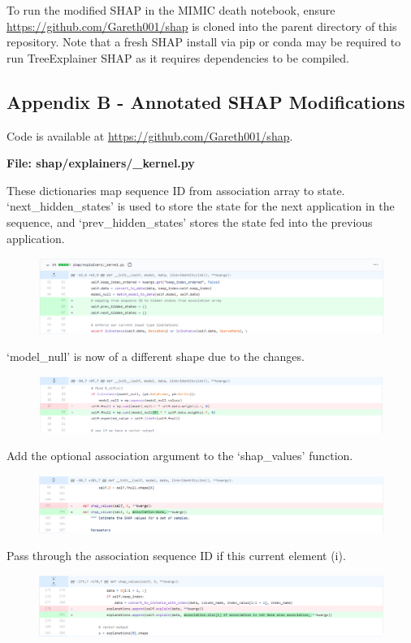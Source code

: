 \documentclass[12pt]{article}
\begin{document}
To run the modified SHAP in the MIMIC death notebook, ensure \url{https://github.com/Gareth001/shap} is cloned into the parent directory of this repository. Note that a fresh SHAP install via pip or conda may be required to run TreeExplainer SHAP as it requires dependencies to be compiled. 

\subsection{Appendix B - Annotated SHAP Modifications}

Code is available at \url{https://github.com/Gareth001/shap}. 

\textbf{File: shap/explainers/\_kernel.py}

These dictionaries map sequence ID from association array to state. `next\_hidden\_states' is used to store the state for the next application in the sequence, and `prev\_hidden\_states' stores the state fed into the previous application.
\begin{figure}[H]
\includegraphics[scale=0.4]{diff/diff_1.png}
\end{figure}
`model\_null' is now of a different shape due to the changes. 
\begin{figure}[H]
\includegraphics[scale=0.4]{diff/diff_2.png}
\end{figure}
Add the optional association argument to the `shap\_values' function.
\begin{figure}[H]
\includegraphics[scale=0.4]{diff/diff_3.png}
\end{figure}
Pass through the association sequence ID if this current element (i).
\begin{figure}[H]
\includegraphics[scale=0.4]{diff/diff_4.png}
\end{figure}
\end{document}
